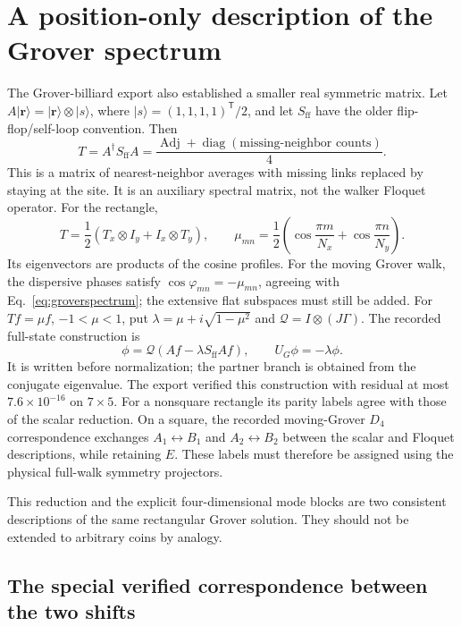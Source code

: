 \documentclass[11pt,a4paper,oneside]{report}
\newcommand{\ket}[1]{\lvert #1\rangle}
\newcommand{\Id}{I}
\newcommand{\diag}{\operatorname{diag}}
\numberwithin{equation}{chapter}
\begin{document}
\section{A position-only description of the Grover spectrum}

The Grover-billiard export also established a smaller real symmetric
matrix. Let \(A\ket{\mathbf r}=\ket{\mathbf r}\otimes\ket s\),
where \(\ket s=(1,1,1,1)^{\mathsf T}/2\), and let
\(S_{\mathrm{ff}}\) have the older flip-flop/self-loop convention.
Then
\begin{equation}
T=A^\dagger S_{\mathrm{ff}}A
=\frac{\operatorname{Adj}+\diag(\text{missing-neighbor counts})}{4}.
\end{equation}
This is a matrix of nearest-neighbor averages with missing links
replaced by staying at the site. It is an auxiliary spectral matrix,
not the walker Floquet operator. For the rectangle,
\begin{equation}
T=\frac12(T_x\otimes\Id_y+\Id_x\otimes T_y),\qquad
\mu_{mn}=\frac12\left(\cos\frac{\pi m}{N_x}
+\cos\frac{\pi n}{N_y}\right).
\end{equation}
Its eigenvectors are products of the cosine profiles. For the moving
Grover walk, the dispersive phases satisfy
\(\cos\varphi_{mn}=-\mu_{mn}\), agreeing with
Eq.~\eqref{eq:groverspectrum}; the extensive flat subspaces must still
be added. For \(Tf=\mu f\), \(-1<\mu<1\), put
\(\lambda=\mu+i\sqrt{1-\mu^2}\) and
\(\mathcal Q=\Id\otimes(J\Gamma)\). The recorded full-state
construction is
\begin{equation}
\phi=\mathcal Q(Af-\lambda S_{\mathrm{ff}}Af),\qquad
U_G\phi=-\lambda\phi.
\end{equation}
It is written before normalization; the partner branch is obtained
from the conjugate eigenvalue. The export verified this construction
with residual at most \(7.6\times10^{-16}\) on \(7\times5\).
For a nonsquare rectangle its parity labels agree with those of the
scalar reduction. On a square, the recorded moving-Grover
\(D_4\) correspondence exchanges \(A_1\leftrightarrow B_1\) and
\(A_2\leftrightarrow B_2\) between the scalar and Floquet descriptions,
while retaining \(E\). These labels must therefore be assigned using
the physical full-walk symmetry projectors.

This reduction and the explicit four-dimensional mode blocks are two
consistent descriptions of the same rectangular Grover solution.
They should not be extended to arbitrary coins by analogy.

\subsection{The special verified correspondence between the two shifts}
\end{document}
